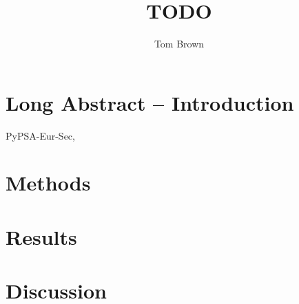 \documentclass[10pt,5p,reversenotenum,lefttitle]{elsarticle}
\begin{document}
\begin{frontmatter}

	\title{TODO}
    
    \author[tub]{Tom Brown}
	\address[tub]{Department of Digital Transformation in Energy Systems, Institute of Energy Technology, Technische Universität Berlin, Fakultät III, Einsteinufer 25 (TA 8), 10587 Berlin, Germany}

\end{frontmatter}

\section{Long Abstract -- Introduction}

PyPSA-Eur-Sec,\cite{PyPSAEurSecSectorCoupled}
\lipsum[2-4]

\section*{Methods}

\lipsum[2-4]

\section*{Results}

\lipsum[2-4]

\section*{Discussion}

\lipsum[2-4]


\end{document}
